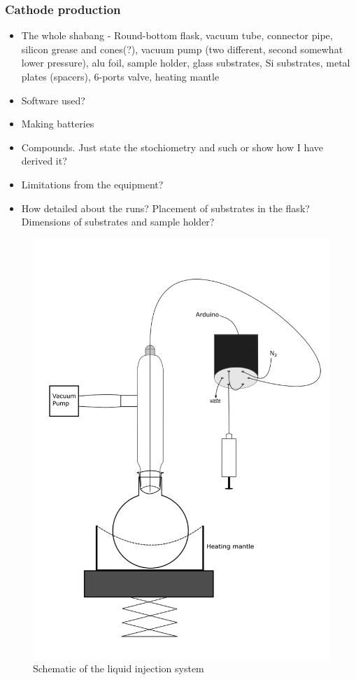 \documentclass[Main/main.tex]{subfiles}
\begin{document}
\subsubsection{Cathode production}

\begin{itemize}
    \item The whole shabang - Round-bottom flask, vacuum tube, connector pipe, silicon grease and cones(?), vacuum pump (two different, second somewhat lower pressure), alu foil, sample holder, glass substrates, Si substrates, metal plates (spacers), 6-ports valve, heating mantle 
    \item Software used?
    \item Making batteries
    \item Compounds. Just state the stochiometry and such or show how I have derived it?
    \item Limitations from the equipment?
    \item How detailed about the runs? Placement of substrates in the flask? Dimensions of substrates and sample holder?
\end{itemize}

\begin{figure}[p]
\centering
\includegraphics[width=1\linewidth]{uploads/ehhh1}
\caption{Schematic of the liquid injection system}
\label{fig:ehhh1}
\end{figure}
\end{document}

